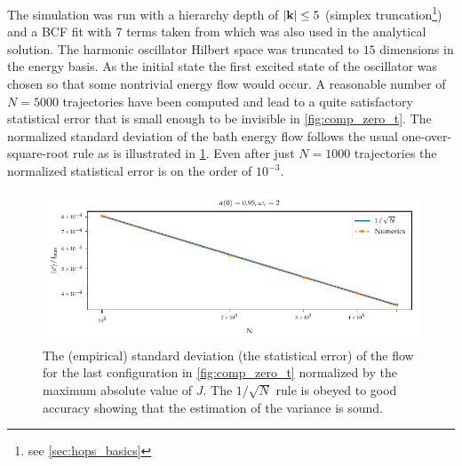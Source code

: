 The simulation was run with a hierarchy depth of
\(\abs{\vb{k}} \leq 5\) (simplex truncation\footnote{see
  \cref{sec:hops_basics}}) and a BCF fit with \(7\) terms taken from
\cite{RichardDiss} which was also used in the analytical solution. The
harmonic oscillator Hilbert space was truncated to \(15\) dimensions
in the energy basis. As the initial state the first excited state of
the oscillator was chosen so that some nontrivial energy flow would
occur. A reasonable number of \(N=5000\) trajectories have been
computed and lead to a quite satisfactory statistical error that is
small enough to be invisible in \cref{fig:comp_zero_t}. The normalized
standard deviation of the bath energy flow follows the usual
one-over-square-root rule as is illustrated in
\cref{fig:sqrt_conv}. Even after just \(N=1000\) trajectories the
normalized statistical error is on the order of \(10^{-3}\).
\begin{figure}[htp]
  \centering
  \includegraphics{figs/analytic_comp/sqrt_convergence.pdf}
  \caption{\label{fig:sqrt_conv} The (empirical) standard deviation
    (the statistical error) of the flow for the last configuration in
    \cref{fig:comp_zero_t} normalized by the maximum absolute value of
    \(J\). The \(1/\sqrt{N}\) rule is obeyed to good accuracy showing
    that the estimation of the variance is sound.}
\end{figure}
